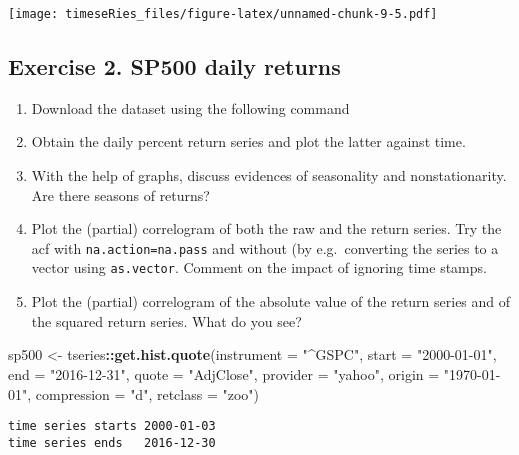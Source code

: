 \documentclass[]{book}
\newenvironment{Shaded}{\begin{snugshade}}{\end{snugshade}}
\newcommand{\KeywordTok}[1]{\textcolor[rgb]{0.13,0.29,0.53}{\textbf{#1}}}
\newcommand{\DataTypeTok}[1]{\textcolor[rgb]{0.13,0.29,0.53}{#1}}
\newcommand{\StringTok}[1]{\textcolor[rgb]{0.31,0.60,0.02}{#1}}
\newcommand{\OperatorTok}[1]{\textcolor[rgb]{0.81,0.36,0.00}{\textbf{#1}}}
\newcommand{\NormalTok}[1]{#1}
\providecommand{\tightlist}{%
  \setlength{\itemsep}{0pt}\setlength{\parskip}{0pt}}
\begin{document}
\texttt{[image: timeseRies\_files/figure-latex/unnamed-chunk-9-5.pdf]}

\subsection{Exercise 2. SP500 daily
returns}\label{exercise-2.-sp500-daily-returns-1}

\begin{enumerate}
\def\labelenumi{\arabic{enumi}.}
\tightlist
\item
  Download the dataset using the following command
\item
  Obtain the daily percent return series and plot the latter against
  time.
\item
  With the help of graphs, discuss evidences of seasonality and
  nonstationarity. Are there seasons of returns?
\item
  Plot the (partial) correlogram of both the raw and the return series.
  Try the acf with \texttt{na.action=na.pass} and without (by
  e.g.~converting the series to a vector using \texttt{as.vector}.
  Comment on the impact of ignoring time stamps.
\item
  Plot the (partial) correlogram of the absolute value of the return
  series and of the squared return series. What do you see?
\end{enumerate}

\begin{Shaded}
\begin{Highlighting}[]
\NormalTok{sp500 <-}\StringTok{ }\NormalTok{tseries}\OperatorTok{::}\KeywordTok{get.hist.quote}\NormalTok{(}\DataTypeTok{instrument =} \StringTok{"^GSPC"}\NormalTok{, }\DataTypeTok{start =} \StringTok{"2000-01-01"}\NormalTok{, }
    \DataTypeTok{end =} \StringTok{"2016-12-31"}\NormalTok{, }\DataTypeTok{quote =} \StringTok{"AdjClose"}\NormalTok{, }\DataTypeTok{provider =} \StringTok{"yahoo"}\NormalTok{, }\DataTypeTok{origin =} \StringTok{"1970-01-01"}\NormalTok{, }
    \DataTypeTok{compression =} \StringTok{"d"}\NormalTok{, }\DataTypeTok{retclass =} \StringTok{"zoo"}\NormalTok{)}
\end{Highlighting}
\end{Shaded}

\begin{verbatim}
time series starts 2000-01-03
time series ends   2016-12-30
\end{verbatim}
\end{document}
